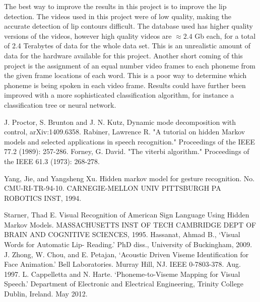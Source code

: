 \documentclass[a4paper]{article}
\begin{document}
The best way to improve the results in this project is to improve the lip detection.  The videos used in this project were of low quality, making the accurate detection of lip contours difficult.  The database used has higher quality versions of the videos, however high quality videos are $\approx 2.4$ Gb each, for a total of 2.4 Terabytes of data for the whole data set.  This is an unrealistic amount of data for the hardware available for this project.  Another short coming of this project is the assignment of an equal number video frames to each phoneme from the given frame locations of each word.  This is a poor way to determine which phoneme is being spoken in each video frame.  Results could have further been improved with a more sophisticated classification algorithm, for instance a classification tree or neural network.  




\begin{thebibliography}{1}
	J. Proctor, S. Brunton and J. N. Kutz, Dynamic mode decomposition with control, arXiv:1409.6358.
	Rabiner, Lawrence R. "A tutorial on hidden Markov models and selected applications in speech recognition." Proceedings of the IEEE 77.2 (1989): 257-286.	
	Forney, G. David. "The viterbi algorithm." Proceedings of the IEEE 61.3 (1973): 268-278.
	
	Yang, Jie, and Yangsheng Xu. Hidden markov model for gesture recognition. No. CMU-RI-TR-94-10. CARNEGIE-MELLON UNIV PITTSBURGH PA ROBOTICS INST, 1994.

	Starner, Thad E. Visual Recognition of American Sign Language Using Hidden Markov Models. MASSACHUSETTS INST OF TECH CAMBRIDGE DEPT OF BRAIN AND COGNITIVE SCIENCES, 1995.
	Hassanat, Ahmad B., `Visual Words for Automatic Lip- Reading.' PhD diss., University of Buckingham, 2009.
	J. Zhong, W. Chou, and E. Petajan, `Acoustic Driven Viseme Identification for Face Animation.' Bell Laboratories. Murray Hill, NJ. IEEE 0-7803-378. Aug. 1997.
	L. Cappelletta and N. Harte. `Phoneme-to-Viseme Mapping for Visual Speech.' Department of Electronic and Electrical Engineering, Trinity College Dublin, Ireland. May 2012.

\end{thebibliography}

\newpage

\appendix
\end{document}
